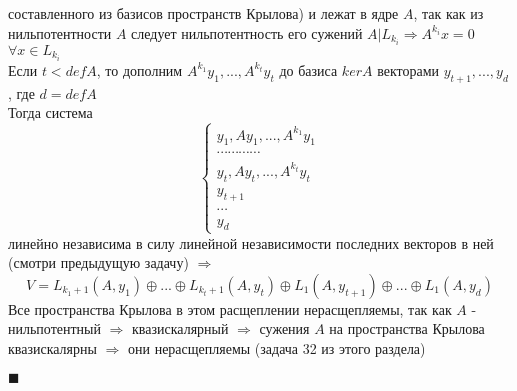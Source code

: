 \documentclass[a4paper,12pt,titlepage,final]{article}
\begin{document}
\begin{itemize}
    составленного из базисов пространств Крылова) и лежат в ядре $A$, так как из нильпотентности $A$ следует 
    нильпотентность его сужений $A|L_{k_i} \Rightarrow A^{k_i}x = 0$ $\forall x \in L_{k_i}$ \\
    Если $t < defA$, то дополним $A^{k_1}y_1, ... , A^{k_t}y_t$ до базиса $kerA$ векторами $y_{t + 1}, ... , y_d$, где 
    $d = defA$ \\
    Тогда система 
    $$
    \begin{cases}
        y_1, Ay_1, ... , A^{k_1} y_1 \\
        \cdots \cdots \cdots \cdots \\
        y_t , Ay_t, ... , A^{k_t} y_t \\
        y_{t + 1} \\
        \cdots \\
        y_d
    \end{cases}
    $$
    линейно независима в силу линейной независимости последних векторов в ней (смотри предыдущую задачу) $\Rightarrow$ 
    $$V = L_{k_1 + 1}(A, y_1) \oplus ... \oplus L_{k_t + 1}(A, y_t) \oplus L_1(A, y_{t + 1}) \oplus ... \oplus L_1(A, y_d)$$
    Все пространства Крылова в этом расщеплении нерасщепляемы, так как $A$ - нильпотентный $\Rightarrow$ квазискалярный $\Rightarrow$ 
    сужения $A$ на пространства Крылова квазискалярны $\Rightarrow$ они нерасщепляемы (задача 32 из этого раздела)
\end{itemize}
$\blacksquare$ \\ \\ \\


\end{document}
